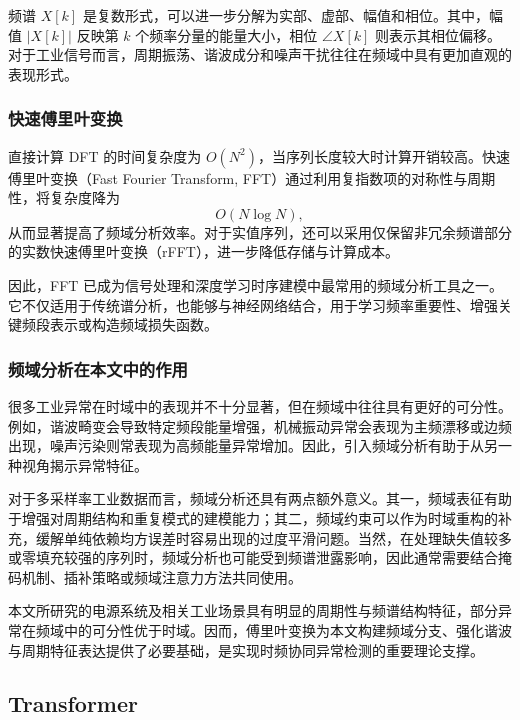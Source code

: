 \documentclass[bachelor, vlined]{DissertUESTC}
\begin{document}
    频谱 $X[k]$ 是复数形式，可以进一步分解为实部、虚部、幅值和相位。其中，幅值 $|X[k]|$ 反映第 $k$ 个频率分量的能量大小，相位 $\angle X[k]$ 则表示其相位偏移。对于工业信号而言，周期振荡、谐波成分和噪声干扰往往在频域中具有更加直观的表现形式。

    \subsubsection{快速傅里叶变换}

    直接计算 DFT 的时间复杂度为 $O(N^2)$，当序列长度较大时计算开销较高。快速傅里叶变换（Fast Fourier Transform, FFT）通过利用复指数项的对称性与周期性，将复杂度降为
    \begin{equation}
        O(N \log N),
    \end{equation}
    从而显著提高了频域分析效率。对于实值序列，还可以采用仅保留非冗余频谱部分的实数快速傅里叶变换（rFFT），进一步降低存储与计算成本。

    因此，FFT 已成为信号处理和深度学习时序建模中最常用的频域分析工具之一。它不仅适用于传统谱分析，也能够与神经网络结合，用于学习频率重要性、增强关键频段表示或构造频域损失函数。

    \subsubsection{频域分析在本文中的作用}

    很多工业异常在时域中的表现并不十分显著，但在频域中往往具有更好的可分性。例如，谐波畸变会导致特定频段能量增强，机械振动异常会表现为主频漂移或边频出现，噪声污染则常表现为高频能量异常增加。因此，引入频域分析有助于从另一种视角揭示异常特征。

    对于多采样率工业数据而言，频域分析还具有两点额外意义。其一，频域表征有助于增强对周期结构和重复模式的建模能力；其二，频域约束可以作为时域重构的补充，缓解单纯依赖均方误差时容易出现的过度平滑问题。当然，在处理缺失值较多或零填充较强的序列时，频域分析也可能受到频谱泄露影响，因此通常需要结合掩码机制、插补策略或频域注意力方法共同使用。

    本文所研究的电源系统及相关工业场景具有明显的周期性与频谱结构特征，部分异常在频域中的可分性优于时域。因而，傅里叶变换为本文构建频域分支、强化谐波与周期特征表达提供了必要基础，是实现时频协同异常检测的重要理论支撑。

    \subsection{Transformer}
\end{document}
